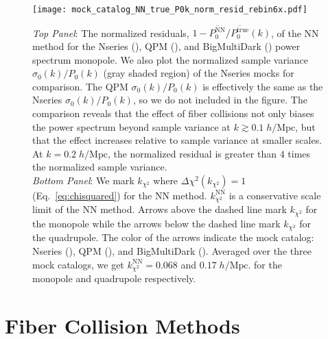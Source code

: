 \begin{figure}
\begin{center}
\texttt{[image: mock\_catalog\_NN\_true\_P0k\_norm\_resid\_rebin6x.pdf]} 
\caption{{\it Top Panel}: The normalized residuals, 
$1 - \overline{P_0^\mathrm{NN}}/\overline{P_0^\mathrm{true}}(k)$, 
of the NN method for the Nseries (\nseriescolor), 
QPM (\qpmcolor), and BigMultiDark (\bmdcolor) power spectrum monopole. 
We also plot the normalized sample variance $\sigma_0(k) / P_0(k)$ 
(gray shaded region) of the Nseries mocks for comparison.
The QPM $\sigma_0(k) / P_0(k)$ is effectively the same as the Nseries 
$\sigma_0(k)/P_0(k)$, so we do not included in the figure. 
The comparison reveals that the effect of fiber collisions not only 
biases the power spectrum beyond sample variance at $k \gtrsim 0.1 \;h/\mathrm{Mpc}$, 
but that the effect increases relative to sample variance at smaller scales. At 
$k = 0.2\;h/\mathrm{Mpc}$,  
the normalized residual is greater than $4$ times the normalized sample variance.\\
{\it Bottom Panel}: We mark $k_{\chi^2}$ where $\Delta \chi^2(k_{\chi^2}) = 1$ (Eq.~\ref{eq:chisquared}) for the NN method. $k^\mathrm{NN}_{\chi^2}$ is a conservative 
scale limit of the NN method. Arrows above the dashed 
line mark $k_{\chi^2}$ for the monopole while the arrows below the dashed line mark
$k_{\chi^2}$ for the quadrupole. The color of the arrows indicate the mock catalog: 
Nseries (\nseriescolor), QPM (\qpmcolor), and BigMultiDark (\bmdcolor). Averaged
over the three mock catalogs, we get $k^\mathrm{NN}_{\chi^2} = 0.068$ and $0.17 \;h/\mathrm{Mpc}$.
for the monopole and quadrupole respectively.}
\label{fig:NN_norm_resid}
\end{center}
\end{figure}
\section{Fiber Collision Methods} \label{sec:fc_corr}
